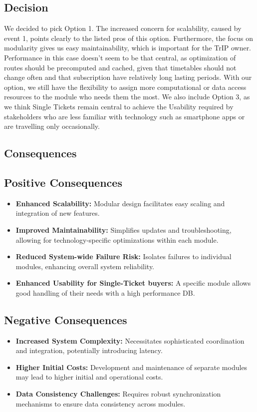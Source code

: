 \subsection*{Decision}
We decided to pick Option 1. The increased concern for scalability, caused by event 1, points clearly to the listed pros of this option. Furthermore, the focus on modularity
gives us easy maintainability, which is important for the TrIP owner.
Performance in this case doesn't seem to be that central, as optimization of routes should be precomputed and cached, given that timetables should not change often and that subscription have relatively long lasting periods.
With our option, we still have the flexibility to assign more computational or data access resources to the module who needs them the most.
We also include Option 3, as we think Single Tickets remain central to achieve the Usability required by stakeholders who are less familiar with technology such as smartphone apps or are travelling only occasionally.

\subsection*{Consequences}
\subsection*{Positive Consequences}

\begin{itemize}[noitemsep]
    \item \textbf{Enhanced Scalability:} Modular design facilitates easy scaling and integration of new features.
    \item \textbf{Improved Maintainability:} Simplifies updates and troubleshooting, allowing for technology-specific optimizations within each module.
    \item \textbf{Reduced System-wide Failure Risk:} Isolates failures to individual modules, enhancing overall system reliability.
    \item \textbf{Enhanced Usability for Single-Ticket buyers:} A specific module allows good handling of their needs with a high performance DB.
\end{itemize}

\subsection*{Negative Consequences}

\begin{itemize}[noitemsep]
    \item \textbf{Increased System Complexity:} Necessitates sophisticated coordination and integration, potentially introducing latency.
    \item \textbf{Higher Initial Costs:} Development and maintenance of separate modules may lead to higher initial and operational costs.
    \item \textbf{Data Consistency Challenges:} Requires robust synchronization mechanisms to ensure data consistency across modules.
\end{itemize}

